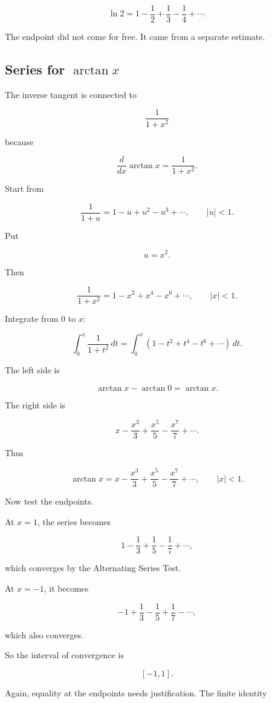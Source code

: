 \[
\boxed{
\ln 2
=
1-\frac12+\frac13-\frac14+\cdots.
}
\]

The endpoint did not come for free.  It came from a separate estimate.

\subsection{\texorpdfstring{Series for \(\arctan x\)}{Series for arctan x}}
\label{subsec:series-for-arctan}

The inverse tangent is connected to

\[
\frac1{1+x^2}
\]

because

\[
\frac{d}{dx}\arctan x=\frac1{1+x^2}.
\]

Start from

\[
\frac1{1+u}=1-u+u^2-u^3+\cdots,
\qquad |u|<1.
\]

Put

\[
u=x^2.
\]

Then

\[
\frac1{1+x^2}
=
1-x^2+x^4-x^6+\cdots,
\qquad |x|<1.
\]

Integrate from \(0\) to \(x\):

\[
\int_0^x \frac1{1+t^2}\,dt
=
\int_0^x (1-t^2+t^4-t^6+\cdots)\,dt.
\]

The left side is

\[
\arctan x-\arctan 0=\arctan x.
\]

The right side is

\[
x-\frac{x^3}{3}+\frac{x^5}{5}-\frac{x^7}{7}+\cdots.
\]

Thus

\[
\boxed{
\arctan x
=
x-\frac{x^3}{3}+\frac{x^5}{5}-\frac{x^7}{7}+\cdots,
\qquad |x|<1.
}
\]

Now test the endpoints.

At \(x=1\), the series becomes

\[
1-\frac13+\frac15-\frac17+\cdots,
\]

which converges by the Alternating Series Test.

At \(x=-1\), it becomes

\[
-1+\frac13-\frac15+\frac17-\cdots,
\]

which also converges.

So the interval of convergence is

\[
\boxed{[-1,1].}
\]

Again, equality at the endpoints needs justification.  The finite identity

